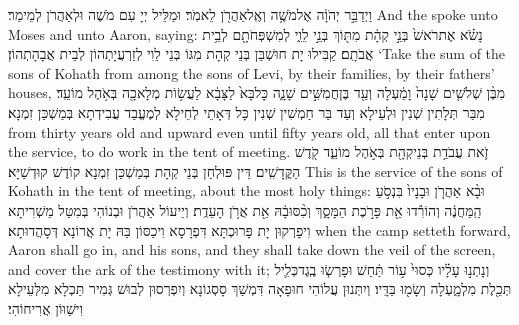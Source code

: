 \newperek
{}
{וַיְדַבֵּ֣ר יְהֹוָ֔ה אֶל\maqqaf מֹשֶׁ֥ה וְאֶֽל\maqqaf אַהֲרֹ֖ן לֵאמֹֽר׃}
{וּמַלֵּיל יְיָ עִם מֹשֶׁה וּלְאַהֲרֹן לְמֵימַר׃}
{And the \lord\space spoke unto Moses and unto Aaron, saying:}{}
{נָשֹׂ֗א אֶת\maqqaf רֹאשׁ֙ בְּנֵ֣י קְהָ֔ת מִתּ֖וֹךְ בְּנֵ֣י לֵוִ֑י לְמִשְׁפְּחֹתָ֖ם לְבֵ֥ית אֲבֹתָֽם׃}
{קַבִּילוּ יָת חוּשְׁבַּן בְּנֵי קְהָת מִגּוֹ בְּנֵי לֵוִי לְזַרְעֲיָתְהוֹן לְבֵית אֲבָהָתְהוֹן׃}
{‘Take the sum of the sons of Kohath from among the sons of Levi, by their families, by their fathers’ houses,}{}
{מִבֶּ֨ן שְׁלֹשִׁ֤ים שָׁנָה֙ וָמַ֔עְלָה וְעַ֖ד בֶּן\maqqaf חֲמִשִּׁ֣ים שָׁנָ֑ה כׇּל\maqqaf בָּא֙ לַצָּבָ֔א לַעֲשׂ֥וֹת מְלָאכָ֖ה בְּאֹ֥הֶל מוֹעֵֽד׃}
{מִבַּר תְּלָתִין שְׁנִין וּלְעֵילָא וְעַד בַּר חַמְשִׁין שְׁנִין כָּל דְּאָתֵי לְחֵילָא לְמֶעֱבַד עֲבִידְתָא בְּמַשְׁכַּן זִמְנָא׃}
{from thirty years old and upward even until fifty years old, all that enter upon the service, to do work in the tent of meeting.}{}
{זֹ֛את עֲבֹדַ֥ת בְּנֵי\maqqaf קְהָ֖ת בְּאֹ֣הֶל מוֹעֵ֑ד קֹ֖דֶשׁ הַקֳּדָשִֽׁים׃}
{דֵּין פּוּלְחַן בְּנֵי קְהָת בְּמַשְׁכַּן זִמְנָא קוֹדֶשׁ קוּדְשַׁיָּא׃}
{This is the service of the sons of Kohath in the tent of meeting, about the most holy things:}{}
{וּבָ֨א אַהֲרֹ֤ן וּבָנָיו֙ בִּנְסֹ֣עַ הַֽמַּחֲנֶ֔ה וְהוֹרִ֕דוּ אֵ֖ת פָּרֹ֣כֶת הַמָּסָ֑ךְ וְכִ֨סּוּ\maqqaf בָ֔הּ אֵ֖ת אֲרֹ֥ן הָעֵדֻֽת׃}
{וְיֵיעוֹל אַהֲרֹן וּבְנוֹהִי בְּמִטַּל מַשְׁרִיתָא וִיפָרְקוּן יָת פָּרוּכְתָּא דִּפְרָסָא וִיכַסּוֹן בַּהּ יָת אֲרוֹנָא דְּסָהֲדוּתָא׃}
{when the camp setteth forward, Aaron shall go in, and his sons, and they shall take down the veil of the screen, and cover the ark of the testimony with it;}{}
{וְנָתְנ֣וּ עָלָ֗יו כְּסוּי֙ ע֣וֹר תַּ֔חַשׁ וּפָרְשׂ֧וּ בֶֽגֶד\maqqaf כְּלִ֛יל תְּכֵ֖לֶת מִלְמָ֑עְלָה וְשָׂמ֖וּ בַּדָּֽיו׃}
{וְיִתְּנוּן עֲלוֹהִי חוּפָאָה דִּמְשַׁךְ סָסְגוֹנָא וְיִפְרְסוּן לְבוּשׁ גְּמִיר תַּכְלָא מִלְּעֵילָא וִישַׁוּוֹן אֲרִיחוֹהִי׃}
